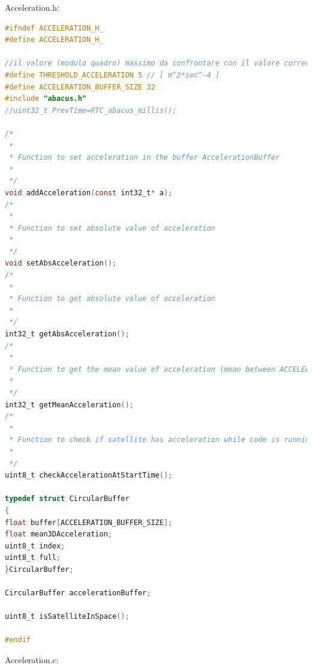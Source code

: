 \documentclass[LaM,binding=0.6cm]{../sapthesis}
\begin{document}
Acceleration.h:
\begin{small}
\begin{lstlisting}[language=C]
#ifndef ACCELERATION_H_
#define ACCELERATION_H_

//il valore (modulo quadro) massimo da confrontare con il valore corrente di accelerazione (servirÃ  un valore molto piÃ¹ basso)
#define THRESHOLD_ACCELERATION 5 // [ m^2*sec^-4 ]
#define ACCELERATION_BUFFER_SIZE 32
#include "abacus.h"
//uint32_t PrevTime=RTC_abacus_millis();

/*
 *
 * Function to set acceleration in the buffer AccelerationBuffer
 *
 */
void addAcceleration(const int32_t* a);
/*
 *
 * Function to set absolute value of acceleration 
 *
 */
void setAbsAcceleration();
/*
 *
 * Function to get absolute value of acceleration
 *
 */
int32_t getAbsAcceleration();
/*
 *
 * Function to get the mean value of acceleration (mean between ACCELEARTION_BUFFER_SIZE amount of samples)
 *
 */
int32_t getMeanAcceleration();
/*
 *
 * Function to check if satellite has acceleration while code is running. This should check only one time acceleration and stop all the operations if needed for N seconds
 *
 */
uint8_t checkAccelerationAtStartTime();

typedef struct CircularBuffer
{
float buffer[ACCELERATION_BUFFER_SIZE];
float mean3DAcceleration;
uint8_t index;
uint8_t full;
}CircularBuffer;

CircularBuffer accelerationBuffer;

uint8_t isSatelliteInSpace();

#endif
\end{lstlisting}
\end{small}
Acceleration.c:
\end{document}
